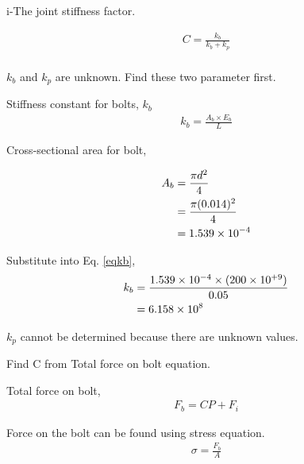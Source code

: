 \documentclass[a4paper, fleqn]{article}
\providecommand{\sci}[1]{\protect\ensuremath{\times 10^{\StrSubstitute[0]{#1}{e}{}}}}
\begin{document}
i-The joint stiffness factor.

\begin{equation} \label{eqjointstiffness}
    \begin{aligned}
    C=\frac{k_b}{k_b+k_p}\\
    \end{aligned}
\end{equation}

$k_b$ and $k_p$ are unknown. Find these two parameter first.

Stiffness constant for bolts, $k_b$
\begin{equation} \label{eqkb}
    \begin{aligned}
    k_b=\frac{A_b \times E_b}{L}
    \end{aligned}
\end{equation}

Cross-sectional area for bolt,

\begin{equation*}
    \begin{aligned}
    A_b &=\frac{\pi d^2}{4}\\
    &= \frac{\pi (0.014)^2}{4}\\
    &= 1.539\sci{e-4}
    \end{aligned}
\end{equation*}

Substitute into Eq. \ref{eqkb},
\begin{equation}
    \begin{aligned}
    k_b &= \frac{1.539\sci{e-4} \times (200\sci{e+9})}{0.05}\\
    &= 6.158\sci{e8}
    \end{aligned}
\end{equation}

$k_p$ cannot be determined because there are unknown values.

Find C from Total force on bolt equation.

Total force on bolt,
\begin{equation} \label{totalForce}
    \begin{aligned}
    F_b=CP+F_i
    \end{aligned}
\end{equation}

Force on the bolt can be found using stress equation.
\begin{equation}
    \begin{aligned}
    \sigma = \frac{F_b}{A}
    \end{aligned}
\end{equation}
\end{document}
